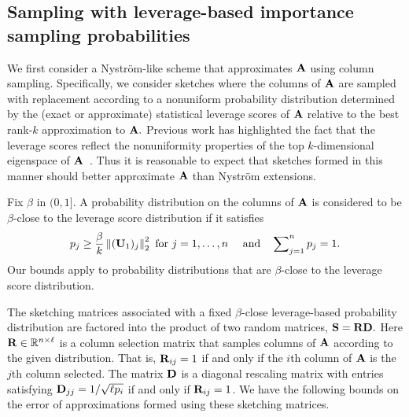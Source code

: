 \subsection{Sampling with leverage-based importance sampling probabilities} 
\label{ch4:sec:theory-rand-levscore}

We first consider a Nystr\"om-like scheme that approximates $\mathbf{A}$ using 
column sampling. Specifically, we consider sketches where the columns of 
$\mathbf{A}$ are sampled with replacement according to a nonuniform probability distribution determined by the 
(exact or approximate)  statistical leverage scores of $\mathbf{A}$ relative to the
best rank-$k$ approximation to $\mathbf{A}.$ Previous work has highlighted the fact that
the leverage scores reflect 
the nonuniformity properties of the top $k$-dimensional eigenspace of $\mathbf{A}$~\cite{Paschou07b,DM09CUR,MM11,YMSCBWD13}.
Thus it is reasonable to expect that sketches formed in this manner should better 
approximate $\mathbf{A}$ than Nystr\"om extensions.

Fix $\beta$ in $(0,1].$ A probability distribution 
on the columns of $\mathbf{A}$ is considered to be $\beta$-close to the leverage 
score distribution if it satisfies
\[
  p_j \geq \frac{\beta}{k}\left\|(\mathbf{U}_1)_j\right\|_2^2 \text{ for $j=1,\ldots,n$ } 
  \quad \text{and} \quad \sum\nolimits_{j=1}^n p_j = 1.
\]
Our bounds apply to probability distributions that are 
$\beta$-close to the leverage score distribution.

The sketching matrices associated with a fixed $\beta$-close
leverage-based probability distribution are factored into the product of two random matrices,
$\mathbf{S} = \mathbf{R} \mathbf{D}.$ Here $\mathbf{R} \in \mathbb{R}^{n \times \ell}$ 
is a column selection matrix that samples columns of $\mathbf{A}$ according to the given 
distribution. That is, $\mathbf{R}_{ij} = 1$ if and only if the $i$th column of $\mathbf{A}$ 
is the $j$th column selected. The matrix $\mathbf{D}$ is a diagonal rescaling matrix with entries
satisfying $\mathbf{D}_{jj} = 1/\sqrt{\ell p_i}$ if and only if $\mathbf{R}_{ij} = 1$. 
We have the following bounds on the error of approximations formed using
these sketching matrices.

